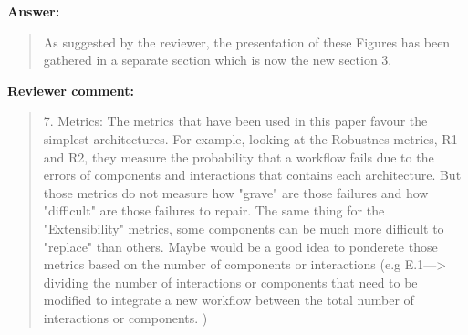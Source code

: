 \documentclass[a4]{article}
\newenvironment{review}%
{\textbf{Reviewer comment:}\begin{quote}}%
{\end{quote}}%
\newenvironment{answer}%
{\textbf{Answer:}\begin{small}\begin{quote}}%
{\end{quote}\end{small}}%
\begin{document}
\begin{answer}
  As suggested by the reviewer, the presentation of these Figures has
  been gathered in a separate section which is now the new section 3.
\end{answer}

\begin{review}
  7.  Metrics: The metrics that have been used in this paper favour
  the simplest architectures. For example, looking at the Robustnes
  metrics, R1 and R2, they measure the probability that a workflow
  fails due to the errors of components and interactions that contains
  each architecture. But those metrics do not measure how "grave" are
  those failures and how "difficult" are those failures to repair. The
  same thing for the "Extensibility" metrics, some components can be
  much more difficult to "replace" than others.  Maybe would be a good
  idea to ponderete those metrics based on the number of components or
  interactions (e.g E.1---> dividing the number of interactions or
  components that need to be modified to integrate a new workflow
  between the total number of interactions or components. )
\end{review}
\end{document}
